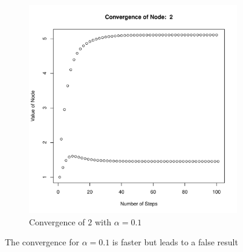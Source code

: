 \begin{figure}[H]
\begin{subfigure}[b]{.45\textwidth}
        \includegraphics[width=\textwidth]{images/figures/convergence2badPerturbation.pdf}
        \caption{Convergence of $2$ with $\alpha = 0.1$}
        \label{fig:sub21}
    \end{subfigure}%
    \label{fig:impactOfPerturbation}
    \caption{The convergence for $\alpha = 0.1$ is faster but leads to a false result}
\end{figure}

